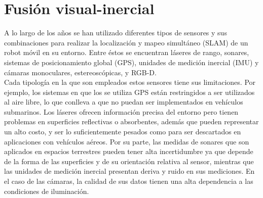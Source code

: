 
\section{Fusión visual-inercial }
A lo largo de los años se han utilizado diferentes tipos de sensores y sus combinaciones para realizar la localización y mapeo simultáneo (SLAM) de un robot móvil en su entorno. Entre éstos se encuentran láseres de rango, sonares, sistemas de posicionamiento global (GPS), unidades de medición inercial (IMU) y cámaras monoculares, estereoscópicas, y RGB-D.\\

Cada tipología en la que son empleados estos sensores tiene sus limitaciones. Por ejemplo, los sistemas en que los se utiliza GPS están restringidos a ser utilizados al aire libre, lo que conlleva a que no puedan ser implementados en vehículos submarinos. Los láseres ofrecen información precisa del entorno pero tienen problemas en superficies reflectivas o absorbentes, además que pueden representar un alto costo,  y  ser lo suficientemente pesados como para ser descartados en aplicaciones con  vehículos aéreos. Por su parte, las medidas de sonares que son aplicados en espacios terrestres pueden tener alta incertidumbre ya que depende de la forma de las superficies y de su orientación relativa al sensor, mientras que las unidades de medición inercial presentan deriva y ruido en sus mediciones. En el caso de las cámaras, la  calidad de sus datos tienen una alta dependencia a las condiciones de iluminación. \\


